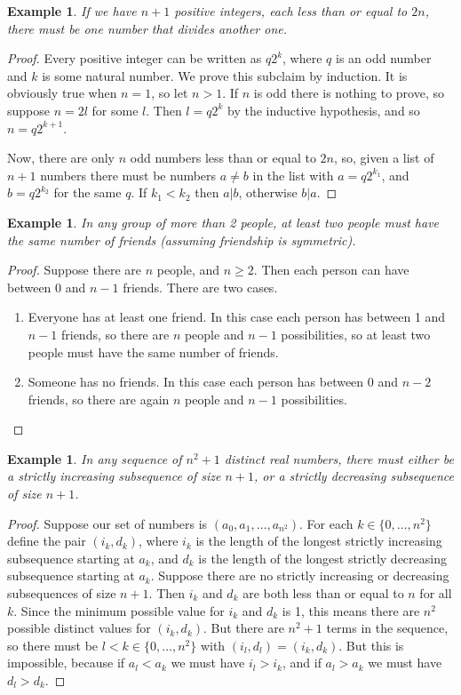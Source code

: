 \documentclass{article}
\theoremstyle{plain}
\newtheorem{example}[theorem]{Example}{\bfseries}{\upshape}
\begin{document}
\begin{example}
If we have $n+1$ positive integers, each less than or equal to $2n$, there must be one number that divides another one.
\end{example}
\begin{proof}
Every positive integer can be written as $q2^k$, where $q$ is an odd number and $k$ is some natural number. We prove this subclaim by induction. It is obviously true when $n=1$, so let $n>1$.  If $n$ is odd there is nothing to prove, so suppose $n = 2l$ for some $l$. Then $l=q2^k$ by the inductive hypothesis, and so $n=q2^{k+1}$. 

Now, there are only $n$ odd numbers less than or equal to $2n$, so, given a list of $n+1$ numbers there must be numbers $a\neq b$ in the list with $a=q2^{k_1}$, and $b= q2^{k_2}$ for the same $q$. If $k_1< k_2$ then $a|b$, otherwise $b|a$. 
\end{proof}

\begin{example}
In any group of more than 2 people, at least two people must have the same number of friends (assuming friendship is symmetric). 
\end{example}
\begin{proof}
Suppose there are $n$ people, and $n\geq 2$. Then each person can have between 0 and $n-1$ friends. There are two cases.
\begin{enumerate}
\item Everyone has at least one friend. In this case each person has between 1 and $n-1$ friends, so there are $n$ people and $n-1$ possibilities, so at least two people must have the same number of friends.
\item Someone has no friends. In this case each person has between 0 and $n-2$ friends, so there are again $n$ people and $n-1$ possibilities.
\end{enumerate}
\end{proof}

\begin{example}
In any sequence of $n^2+1$ distinct real numbers, there must either be a strictly increasing subsequence of size $n+1$, or a strictly decreasing subsequence of size $n+1$.
\end{example}
\begin{proof}
Suppose our set of numbers is $(a_0,a_1,\ldots,a_{n^2})$. For each $k\in\{0,\ldots,n^2\}$ define the pair $(i_k,d_k)$, where $i_k$ is the length of the longest strictly increasing subsequence starting at $a_k$, and $d_k$ is the length of the longest strictly decreasing subsequence starting at $a_k$. Suppose there are no strictly increasing or decreasing subsequences of size $n+1$. Then $i_k$ and $d_k$ are both less than or equal to $n$ for all $k$. Since the minimum possible value for $i_k$ and $d_k$ is 1, this means there are $n^2$ possible distinct values for $(i_k,d_k)$. But there are $n^2+1$ terms in the sequence, so there must be $l<k\in\{0,\ldots,n^2\}$ with $(i_l,d_l)=(i_k,d_k)$. But this is impossible, because if $a_l<a_k$ we must have $i_l>i_k$, and if $a_l > a_k$ we must have $d_l > d_k$. 
\end{proof}
\end{document}
